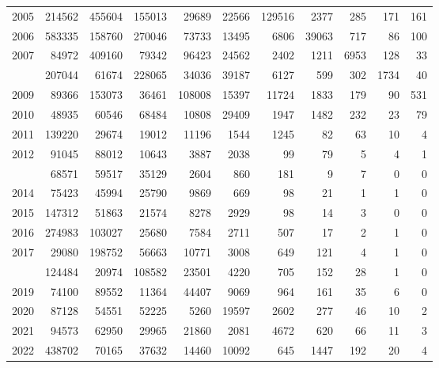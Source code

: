 \documentclass[
]{article}
\begin{document}
\begin{longtable}[t]{lrrrrrrrrrr}
2005 & 214562 & 455604 & 155013 & 29689 & 22566 & 129516 & 2377 & 285 & 171 & 161\\
2006 & 583335 & 158760 & 270046 & 73733 & 13495 & 6806 & 39063 & 717 & 86 & 100\\
2007 & 84972 & 409160 & 79342 & 96423 & 24562 & 2402 & 1211 & 6953 & 128 & 33\\
\addlinespace
2008 & 207044 & 61674 & 228065 & 34036 & 39187 & 6127 & 599 & 302 & 1734 & 40\\
2009 & 89366 & 153073 & 36461 & 108008 & 15397 & 11724 & 1833 & 179 & 90 & 531\\
2010 & 48935 & 60546 & 68484 & 10808 & 29409 & 1947 & 1482 & 232 & 23 & 79\\
2011 & 139220 & 29674 & 19012 & 11196 & 1544 & 1245 & 82 & 63 & 10 & 4\\
2012 & 91045 & 88012 & 10643 & 3887 & 2038 & 99 & 79 & 5 & 4 & 1\\
\addlinespace
2013 & 68571 & 59517 & 35129 & 2604 & 860 & 181 & 9 & 7 & 0 & 0\\
2014 & 75423 & 45994 & 25790 & 9869 & 669 & 98 & 21 & 1 & 1 & 0\\
2015 & 147312 & 51863 & 21574 & 8278 & 2929 & 98 & 14 & 3 & 0 & 0\\
2016 & 274983 & 103027 & 25680 & 7584 & 2711 & 507 & 17 & 2 & 1 & 0\\
2017 & 29080 & 198752 & 56663 & 10771 & 3008 & 649 & 121 & 4 & 1 & 0\\
\addlinespace
2018 & 124484 & 20974 & 108582 & 23501 & 4220 & 705 & 152 & 28 & 1 & 0\\
2019 & 74100 & 89552 & 11364 & 44407 & 9069 & 964 & 161 & 35 & 6 & 0\\
2020 & 87128 & 54551 & 52225 & 5260 & 19597 & 2602 & 277 & 46 & 10 & 2\\
2021 & 94573 & 62950 & 29965 & 21860 & 2081 & 4672 & 620 & 66 & 11 & 3\\
2022 & 438702 & 70165 & 37632 & 14460 & 10092 & 645 & 1447 & 192 & 20 & 4\\*
\end{longtable}
\end{document}
